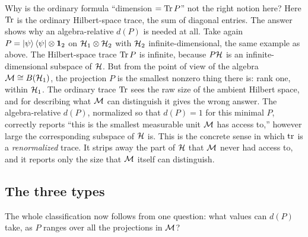 Why is the ordinary formula ``dimension $=\operatorname{Tr} P$'' not the right notion here? Here $\operatorname{Tr}$ is the ordinary
Hilbert-space trace, the sum of diagonal entries. The answer shows why an algebra-relative $d(P)$ is needed
at all. Take again $P=\ket\psi\bra\psi\otimes\mathbf{1}_2$ on $\mathcal{H}_1\otimes\mathcal{H}_2$ with $\mathcal{H}_2$ infinite-dimensional,
the same example as above. The Hilbert-space trace $\operatorname{Tr} P$ is infinite, because $P\mathcal{H}$ is an
infinite-dimensional subspace of $\mathcal{H}$. But from the point of view of the algebra $\mathcal{M}\cong B(\mathcal{H}_1)$, the
projection $P$ is the smallest nonzero thing there is: rank one, within $\mathcal{H}_1$. The ordinary trace $\operatorname{Tr}$
sees the raw size of the ambient Hilbert space, and for describing what $\mathcal{M}$ can distinguish it gives the
wrong answer. The algebra-relative $d(P)$, normalized so that $d(P)=1$ for this minimal $P$, correctly reports
``this is the smallest measurable unit $\mathcal{M}$ has access to,'' however large the corresponding subspace of $\mathcal{H}$
is. This is the concrete sense in which $\operatorname{tr}$ is a \emph{renormalized} trace. It strips away the part of $\mathcal{H}$
that $\mathcal{M}$ never had access to, and it reports only the size that $\mathcal{M}$ itself can distinguish.

\subsection*{The three types}

The whole classification now follows from one question: what values can $d(P)$ take, as $P$ ranges over all
the projections in $\mathcal{M}$?

